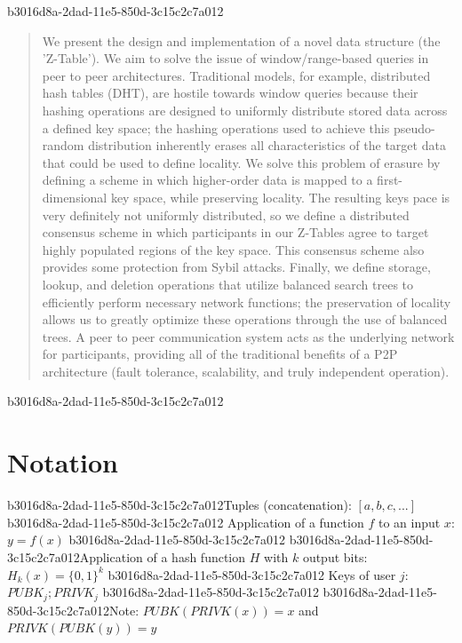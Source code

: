 \documentclass[12pt]{article}
\begin{document}
\maketitle

b3016d8a-2dad-11e5-850d-3c15c2c7a012\begin{abstract}
We present the design and implementation of a novel data structure (the 'Z-Table'). We aim to solve the issue of window/range-based queries in peer to peer architectures. Traditional models, for example,  distributed hash tables (DHT), are hostile towards window queries because their hashing operations are designed to uniformly distribute stored data across a defined key space; the hashing operations used to achieve this pseudo-random distribution inherently erases all characteristics of the target data that could be used to define locality. We solve this problem of erasure by defining a scheme in which higher-order data is mapped to a first-dimensional key space, while preserving locality. The resulting keys pace is very definitely not uniformly distributed, so we define a distributed consensus scheme in which participants in our Z-Tables agree to target highly populated regions of the key space. This consensus scheme also provides some protection from Sybil attacks. Finally, we define storage, lookup, and deletion operations that utilize balanced search trees to efficiently perform necessary network functions; the preservation of locality allows us to greatly optimize these operations through the use of balanced trees. A peer to peer communication system acts as the underlying network for participants, providing all of the traditional benefits of a P2P architecture (fault tolerance, scalability, and truly independent operation).
\end{abstract}
b3016d8a-2dad-11e5-850d-3c15c2c7a012
\section{Notation}

b3016d8a-2dad-11e5-850d-3c15c2c7a012Tuples (concatenation): $[a,b,c,...]$
b3016d8a-2dad-11e5-850d-3c15c2c7a012
Application of a function $f$ to an input $x$: $y=f(x)$
b3016d8a-2dad-11e5-850d-3c15c2c7a012
b3016d8a-2dad-11e5-850d-3c15c2c7a012Application of a hash function $H$ with $k$ output bits: $H_{k}(x) = \{0,1\}^k$
b3016d8a-2dad-11e5-850d-3c15c2c7a012
Keys of user $j$: $ PUBK_j; PRIVK_j $
b3016d8a-2dad-11e5-850d-3c15c2c7a012
b3016d8a-2dad-11e5-850d-3c15c2c7a012Note: $PUBK(PRIVK(x)) = x$ and $PRIVK(PUBK(y)) = y$~
\end{document}
